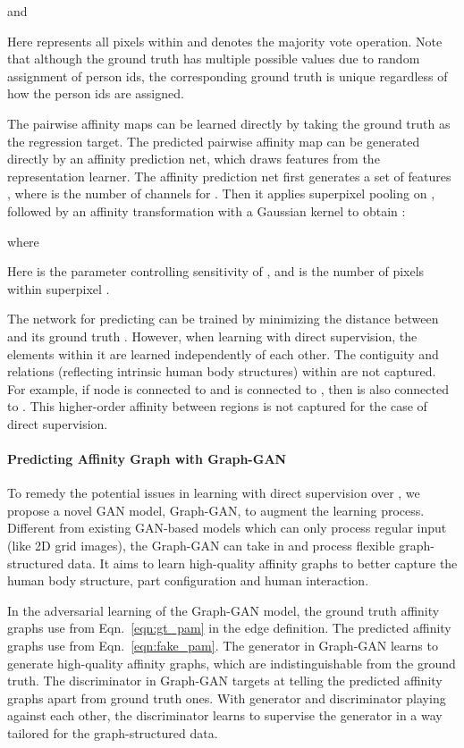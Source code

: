 \documentclass[10pt, letterpaper]{article}
\begin{document}
and

Here  represents all pixels within  and  denotes the majority vote operation. Note that although the ground truth   has multiple possible values due to random assignment of person ids, the corresponding ground truth  is unique regardless of how the person ids are assigned. 

The pairwise affinity maps can be learned directly by taking the ground truth  as the regression target.  The predicted pairwise affinity map  can be generated directly by an affinity prediction net, which draws features from the representation learner. The affinity prediction net first generates a set of features , where  is the number of channels for . Then it applies superpixel pooling on , followed by an affinity transformation with a Gaussian kernel to obtain :

where 

Here  is the parameter controlling sensitivity of , and  is the number of pixels within superpixel .

The network for predicting  can be trained by minimizing the distance between  and its ground truth . However, when learning  with direct supervision, the elements within it are learned independently of each other. The contiguity and relations (reflecting intrinsic human body structures) within    are not captured. For example, if node  is connected to  and  is connected to , then  is also connected to . This higher-order affinity between regions is not captured for the case of direct supervision. 

\paragraph{Predicting Affinity Graph with Graph-GAN}
To remedy the potential issues in learning with direct supervision over , we propose a novel GAN model, Graph-GAN, to augment the learning process. Different from existing GAN-based models which can only process regular input (like 2D grid images), the Graph-GAN can take in and process flexible graph-structured data. It aims to learn high-quality affinity graphs to better capture the human body structure, part configuration and human interaction.  

In the adversarial learning of the Graph-GAN model, the ground truth  affinity graphs use  from Eqn.~\eqref{eqn:gt_pam} in the edge definition. The predicted  affinity graphs use   from Eqn.~\eqref{eqn:fake_pam}. The generator in Graph-GAN learns to generate high-quality affinity graphs, which are indistinguishable from the ground truth. The discriminator in Graph-GAN  targets at telling the predicted affinity graphs apart from ground truth ones. With generator and discriminator playing against each other, the discriminator learns to supervise the generator in a way tailored for the graph-structured data. 
\end{document}
